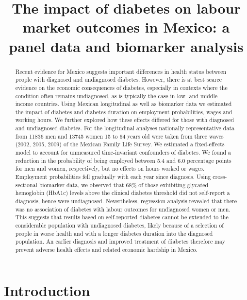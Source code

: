 \documentclass[12pt,english]{article}
\begin{document}
	\title{The impact of diabetes on labour market outcomes in Mexico: a panel data and biomarker analysis}
	\author{}
	
	\maketitle 
	\thispagestyle{empty}
	\clearpage

	
\begin{abstract}
Recent evidence for Mexico suggests important differences in health status between people with diagnosed and undiagnosed diabetes. However, there is at best scarce evidence on the economic consequences of diabetes, especially in contexts where the condition often remains undiagnosed, as is typically the case in low- and middle income countries. Using Mexican longitudinal as well as biomarker data we estimated the impact of diabetes and diabetes duration on employment probabilities, wages and working hours. We further explored how these effects differed for those with diagnosed and undiagnosed diabetes. For the longitudinal analyses nationally representative data from 11836 men and 13745 women 15 to 64 years old were taken from three waves (2002, 2005, 2009) of the Mexican Family Life Survey. We estimated a fixed-effects model to account for unmeasured time-invariant confounders of diabetes. We found a reduction in the probability of being employed between 5.4 and 6.0 percentage points for men and women, respectively, but no effects on hours worked or wages. Employment probabilities fell gradually with each year since diagnosis. Using cross-sectional biomarker data, we observed that 68\% of those exhibiting glycated hemoglobin (HbA1c) levels above the clinical diabetes threshold did not self-report a diagnosis, hence were undiagnosed. Nevertheless, regression analysis revealed that there was no association of diabetes with labour outcomes for undiagnosed women or men. This suggests that results based on self-reported diabetes cannot be extended to the considerable population with undiagnosed diabetes, likely because of a selection of people in worse health and with a longer diabetes duration into the diagnosed population. An earlier diagnosis and improved treatment of diabetes therefore may prevent adverse health effects and related economic hardship in Mexico.
\end{abstract}


\section{\label{sec:Introduction}Introduction }
\end{document}
